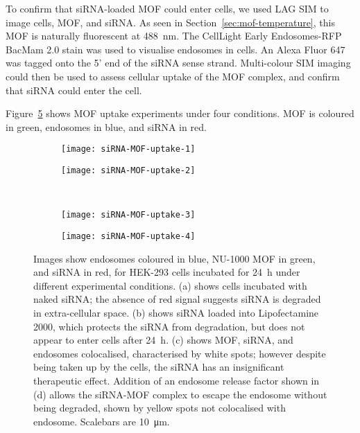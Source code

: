 To confirm that siRNA-loaded MOF could enter cells, we used LAG SIM to image cells, MOF, and siRNA. 
As seen in Section~\ref{sec:mof-temperature}, this MOF is naturally fluorescent at \SI{488}{\nano\metre}. 
The CellLight Early Endosomes-RFP BacMam 2.0 stain was used to visualise endosomes in cells. 
An Alexa Fluor 647 was tagged onto the 5' end of the siRNA sense strand. 
Multi-colour SIM imaging could then be used to assess cellular uptake of the MOF complex, and confirm that siRNA could enter the cell. 

Figure~\ref{fig:siRNA-MOF-uptake} shows MOF uptake experiments under four conditions. 
MOF is coloured in green, endosomes in blue, and siRNA in red. 


\begin{figure}[tbp]
\centering
\begin{subfigure}[b]{0.49\textwidth}
	\texttt{[image: siRNA-MOF-uptake-1]}
	\caption{}\label{fig:siRNA-MOF-uptake-1}
\end{subfigure}
\hfill
\begin{subfigure}[b]{0.49\textwidth}
	\texttt{[image: siRNA-MOF-uptake-2]}
	\caption{}\label{fig:siRNA-MOF-uptake-2}
\end{subfigure}

~\newline
\begin{subfigure}[b]{0.49\textwidth}
	\texttt{[image: siRNA-MOF-uptake-3]}
	\caption{}\label{fig:siRNA-MOF-uptake-3}
\end{subfigure}
\hfill
\begin{subfigure}[b]{0.49\textwidth}
	\texttt{[image: siRNA-MOF-uptake-4]}
	\caption{}\label{fig:siRNA-MOF-uptake-4}
\end{subfigure}
\caption[MOFs: siRNA-loaded NU-1000 is endocytosed by HEK-293 cells, and released to the cytoplasm with an endosome release factor]{Images show endosomes coloured in blue, NU-1000 MOF in green, and siRNA in red, for HEK-293 cells incubated for \SI{24}{\hour} under different experimental conditions. (a) shows cells incubated with naked siRNA; the absence of red signal suggests siRNA is degraded in extra-cellular space. (b) shows siRNA loaded into Lipofectamine 2000, which protects the siRNA from degradation, but does not appear to enter cells after \SI{24}{\hour}. (c) shows MOF, siRNA, and endosomes colocalised, characterised by white spots; however despite being taken up by the cells, the siRNA has an insignificant therapeutic effect. Addition of an endosome release factor shown in (d) allows the siRNA-MOF complex to escape the endosome without being degraded, shown by yellow spots not colocalised with endosome. Scalebars are \SI{10}{\micro\metre}. }
\label{fig:siRNA-MOF-uptake}
\end{figure}


